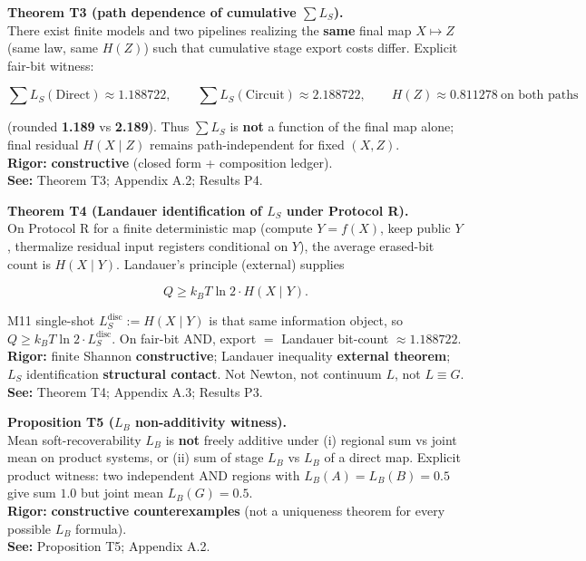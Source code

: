 \documentclass[
  11pt,
]{article}
\begin{document}
\textbf{Theorem T3 (path dependence of cumulative \(\sum L_S\)).}\\
There exist finite models and two pipelines realizing the \textbf{same} final map \(X\mapsto Z\) (same law, same \(H(Z)\)) such that cumulative stage export costs differ. Explicit fair-bit witness:

\[
\sum L_S(\mathrm{Direct})\approx 1.188722,\qquad
\sum L_S(\mathrm{Circuit})\approx 2.188722,\qquad
H(Z)\approx 0.811278\ \text{on both paths}
\]

(rounded \textbf{1.189} vs \textbf{2.189}). Thus \(\sum L_S\) is \textbf{not} a function of the final map alone; final residual \(H(X\mid Z)\) remains path-independent for fixed \((X,Z)\).\\
\textbf{Rigor:} \textbf{constructive} (closed form + composition ledger).\\
\textbf{See:} Theorem T3; Appendix A.2; Results P4.

\textbf{Theorem T4 (Landauer identification of \(L_S\) under Protocol R).}\\
On Protocol R for a finite deterministic map (compute \(Y=f(X)\), keep public \(Y\), thermalize residual input registers conditional on \(Y\)), the average erased-bit count is \(H(X\mid Y)\). Landauer's principle (external) supplies

\[
Q\ge k_B T\ln 2\cdot H(X\mid Y).
\]

M11 single-shot \(L_S^{\mathrm{disc}}:=H(X\mid Y)\) is that same information object, so \(Q\ge k_B T\ln 2\cdot L_S^{\mathrm{disc}}\). On fair-bit AND, export \(=\) Landauer bit-count \(\approx 1.188722\).\\
\textbf{Rigor:} finite Shannon \textbf{constructive}; Landauer inequality \textbf{external theorem}; \(L_S\) identification \textbf{structural contact}. Not Newton, not continuum \(L\), not \(L\equiv G\).\\
\textbf{See:} Theorem T4; Appendix A.3; Results P3.

\textbf{Proposition T5 (\(L_B\) non-additivity witness).}\\
Mean soft-recoverability \(L_B\) is \textbf{not} freely additive under (i) regional sum vs joint mean on product systems, or (ii) sum of stage \(L_B\) vs \(L_B\) of a direct map. Explicit product witness: two independent AND regions with \(L_B(A)=L_B(B)=0.5\) give sum \(1.0\) but joint mean \(L_B(G)=0.5\).\\
\textbf{Rigor:} \textbf{constructive counterexamples} (not a uniqueness theorem for every possible \(L_B\) formula).\\
\textbf{See:} Proposition T5; Appendix A.2.
\end{document}
